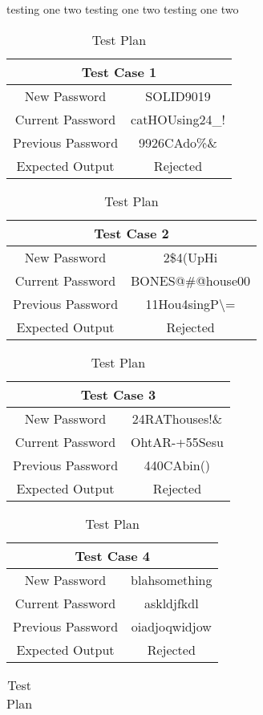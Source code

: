 \documentclass[12pt,letterpaper]{article}
\begin{document}
testing one two
testing one two
testing one two

\begin{table}[h]
  \caption{Test Plan}
  \label{tab:Test Plan}
\begin{centering}
  \begin{tabular}{||c|c||}
  \hline
  \multicolumn{2}{||c||}{Test Case 1} \\
  \hline
  New Password & SOLID9019 \\
  \hline
  Current Password & catHOUsing24\_! \\
  \hline
  Previous Password & 9926CAdo\%\& \\
  \hline
  Expected Output & Rejected \\
  \hline
  \end{tabular}
  \begin{tabular}{||c|c||}
  \hline
  \multicolumn{2}{||c||}{Test Case 2} \\
  \hline
  New Password & 2\$4(UpHi \\
  \hline
  Current Password & BONES@\#@house00 \\
  \hline
  Previous Password & 11Hou4singP\textbackslash= \\
  \hline
  Expected Output & Rejected \\
  \hline
  \end{tabular}
  \begin{tabular}{||c|c||}
  \hline
  \multicolumn{2}{||c||}{Test Case 3} \\
  \hline
  New Password & 24RAThouses!\& \\
  \hline
  Current Password & OhtAR-+55Sesu \\
  \hline
  Previous Password & 440CAbin() \\
  \hline
  Expected Output & Rejected \\
  \hline
  \end{tabular}
  \begin{tabular}{||c|c||}
  \hline
  \multicolumn{2}{||c||}{Test Case 4} \\
  \hline
  New Password & blahsomething \\
  \hline
  Current Password & askldjfkdl \\
  \hline
  Previous Password & oiadjoqwidjow \\
  \hline
  Expected Output & Rejected \\
  \hline
  \end{tabular}
  \begin{tabular}{||c|c||}

\end{tabular}
\end{centering}
\end{table}
\end{document}
